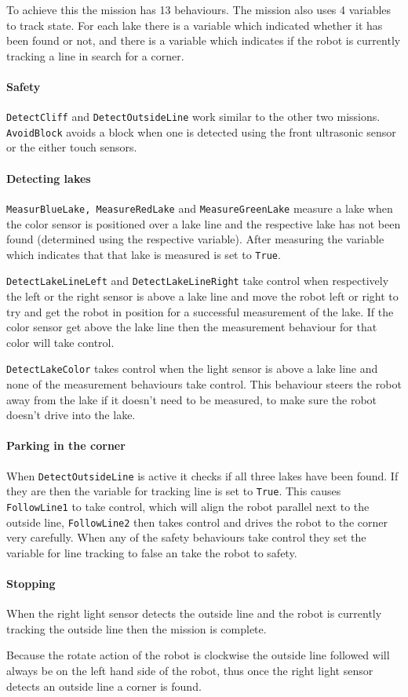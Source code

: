 To achieve this the mission has 13 behaviours. The mission also uses 4 variables
to track state. For each lake there is a variable which indicated whether it has
been found or not, and there is a variable which indicates if the robot is 
currently tracking a line in search for a corner.

\paragraph{Safety} \texttt{DetectCliff} and \texttt{DetectOutsideLine} work 
similar to the other two missions. \texttt{AvoidBlock} avoids a block when one 
is detected using the front ultrasonic sensor or the either touch sensors.

\paragraph{Detecting lakes} \texttt{MeasurBlueLake, MeasureRedLake} and 
\texttt{MeasureGreenLake} measure a lake when the color sensor is positioned 
over a lake line and the respective lake has not been found (determined using
the respective variable). After measuring the variable which indicates that
that lake is measured is set to \texttt{True}.

\texttt{DetectLakeLineLeft} and \texttt{DetectLakeLineRight} take control when
respectively the left or the right sensor is above a lake line and 
move the robot left or right to try and get the robot in position for a 
successful measurement of the lake. If the color sensor get above the lake line
then the measurement behaviour for that color will take control.

\texttt{DetectLakeColor} takes control when the light sensor is above a lake 
line and none of the measurement behaviours take control. This behaviour 
steers the robot away from the lake if it doesn't need to be measured, to make
sure the robot doesn't drive into the lake.

\paragraph{Parking in the corner} When \texttt{DetectOutsideLine} is active
it checks if all three lakes have been found. If they are then the variable
for tracking line is set to \texttt{True}. This causes \texttt{FollowLine1} to
take control, which will align the robot parallel next to the outside line, 
\texttt{FollowLine2} then takes control and drives the robot to the corner 
very carefully. When any of the safety behaviours take control they set the 
variable for line tracking to false an take the robot to safety. 

\paragraph{Stopping} When the right light sensor detects the outside line 
and the robot is currently tracking the outside line then the mission is 
complete. 

Because the rotate action of the robot is clockwise the outside line followed
will always be on the left hand side of the robot, thus once the right light
sensor detects an outside line a corner is found.
